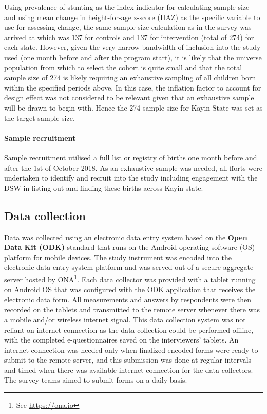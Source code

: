 \documentclass[12pt,a4paper]{article}
\let\oldparagraph\paragraph
\renewcommand{\paragraph}[1]{\oldparagraph{#1}\mbox{}}
\let\rmarkdownfootnote\footnote%
\def\footnote{\protect\rmarkdownfootnote}
\begin{document}
Using prevalence of stunting as the index indicator for calculating sample size and using mean change in height-for-age z-score (HAZ) as the specific variable to use for assessing change, the same sample size calculation as in the survey was arrived at which was 137 for controls and 137 for intervention (total of 274) for each state.
However, given the very narrow bandwidth of inclusion into the study used (one month before and after the program start), it is likely that the universe population from which to select the cohort is quite small and that the total sample size of 274 is likely requiring an exhaustive sampling of all children born within the specified periods above. In this case, the inflation factor to account for design effect was not considered to be relevant given that an exhaustive sample will be drawn to begin with. Hence the 274 sample size for Kayin State was set as the target sample size.

\hypertarget{sample-recruitment}{%
\paragraph{Sample recruitment}\label{sample-recruitment}}

Sample recruitment utilised a full list or registry of births one month before and after the 1st of October 2018. As an exhaustive sample was needed, all fforts were undertaken to identify and recruit into the study including engagement with the DSW in listing out and finding these births across Kayin state.

\hypertarget{data-collection}{%
\subsection{Data collection}\label{data-collection}}

Data was collected using an electronic data entry system based on the \textbf{Open Data Kit (ODK)} standard that runs on the Android operating software (OS) platform for mobile devices. The study instrument was encoded into the electronic data entry system platform and was served out of a secure aggregate server hosted by ONA\footnote{See \url{https://ona.io}}. Each data collector was provided with a tablet running on Android OS that was configured with the ODK application that receives the electronic data form. All measurements and answers by respondents were then recorded on the tablets and transmitted to the remote server whenever there was a mobile and/or wireless internet signal. This data collection system was not reliant on internet connection as the data collection could be performed offline, with the completed e-questionnaires saved on the interviewers' tablets. An internet connection was needed only when finalized encoded forms were ready to submit to the remote server, and this submission was done at regular intervals and timed when there was available internet connection for the data collectors. The survey teams aimed to submit forms on a daily basis.
\end{document}
